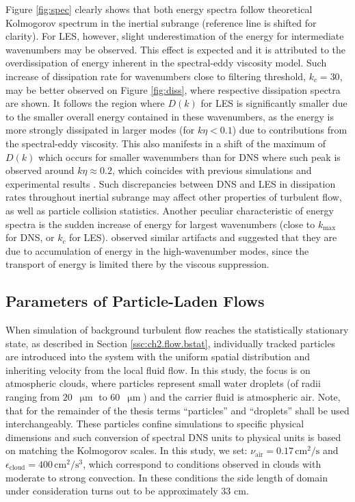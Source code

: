 \documentclass{pracamgren}
\begin{document}
Figure \ref{fig:spec} clearly shows that both energy spectra follow theoretical Kolmogorov spectrum in the inertial subrange (reference line is shifted for clarity).
For LES, however, slight underestimation of the energy for intermediate wavenumbers may be observed.
This effect is expected \parencite{Jin2010} and it is attributed to the overdissipation of energy inherent in the spectral-eddy viscosity model.
Such increase of dissipation rate for wavenumbers close to filtering threshold, $k_{c} = 30$, may be better observed on Figure \ref{fig:diss}, where respective dissipation spectra are shown.
It follows the region where $D(k)$ for LES is significantly smaller due to the smaller overall energy contained in these wavenumbers, as the energy is more strongly dissipated in larger modes (for $k \eta < 0.1$) due to contributions from the spectral-eddy viscosity.
This also manifests in a shift of the maximum of $D(k)$ which occurs for smaller wavenumbers than for DNS where such peak is observed around $k \eta \approx 0.2$, which coincides with previous simulations and experimental results \parencite{Wang1993}.
Such discrepancies between DNS and LES in dissipation rates throughout inertial subrange may affect other properties of turbulent flow, as well as particle collision statistics.
Another peculiar characteristic of energy spectra is the sudden increase of energy for largest wavenumbers (close to $k_{\max}$ for DNS, or $k_{c}$ for LES).
\textcite{Rosa2017} observed similar artifacts and suggested that they are due to accumulation of energy in the high-wavenumber modes, since the transport of energy is limited there by the viscous suppression.



\subsection{Parameters of Particle-Laden Flows}
\label{ssc:ch2.flow.part}

When simulation of background turbulent flow reaches the statistically stationary state, as described in Section \ref{ssc:ch2.flow.bstat}, individually tracked particles are introduced into the system with the uniform spatial distribution and inheriting velocity from the local fluid flow.
In this study, the focus is on atmospheric clouds, where particles represent small water droplets (of radii ranging from $20$~$\upmu\text{m}$ to $60$~$\upmu\text{m}$) and the carrier fluid is atmospheric air.
Note, that for the remainder of the thesis terms ``particles'' and ``droplets'' shall be used interchangeably.
These particles confine simulations to specific physical dimensions and such conversion of spectral DNS units to physical units is based on matching the Kolmogorov scales.
In this study, we set: $\nu_{\text{air}} = 0.17 \, \text{cm}^{2} / \text{s} $ and $\epsilon_{\text{cloud}} = 400 \, \text{cm}^{2} / \text{s}^{3}$, which correspond to conditions observed in clouds with moderate to strong convection.
In these conditions the side length of domain under consideration turns out to be approximately 33 cm.
\end{document}
